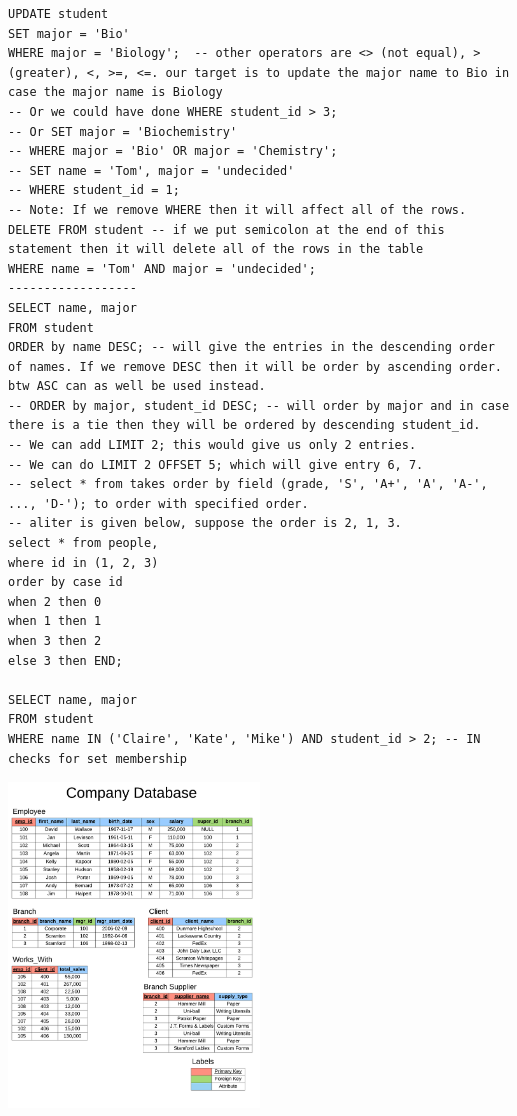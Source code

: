 \documentclass[8pt, a4paper, oneside, twocolumn]{extarticle}
\begin{document}
\begin{verbatim}
UPDATE student
SET major = 'Bio'
WHERE major = 'Biology';  -- other operators are <> (not equal), > (greater), <, >=, <=. our target is to update the major name to Bio in case the major name is Biology
-- Or we could have done WHERE student_id > 3;
-- Or SET major = 'Biochemistry'
-- WHERE major = 'Bio' OR major = 'Chemistry';
-- SET name = 'Tom', major = 'undecided'
-- WHERE student_id = 1;
-- Note: If we remove WHERE then it will affect all of the rows.
DELETE FROM student -- if we put semicolon at the end of this statement then it will delete all of the rows in the table
WHERE name = 'Tom' AND major = 'undecided';
------------------
SELECT name, major
FROM student
ORDER by name DESC; -- will give the entries in the descending order of names. If we remove DESC then it will be order by ascending order. btw ASC can as well be used instead.
-- ORDER by major, student_id DESC; -- will order by major and in case there is a tie then they will be ordered by descending student_id.
-- We can add LIMIT 2; this would give us only 2 entries.
-- We can do LIMIT 2 OFFSET 5; which will give entry 6, 7.
-- select * from takes order by field (grade, 'S', 'A+', 'A', 'A-', ..., 'D-'); to order with specified order.
-- aliter is given below, suppose the order is 2, 1, 3.
select * from people, 
where id in (1, 2, 3)
order by case id
when 2 then 0
when 1 then 1
when 3 then 2
else 3 then END;

SELECT name, major
FROM student
WHERE name IN ('Claire', 'Kate', 'Mike') AND student_id > 2; -- IN checks for set membership
\end{verbatim}
\includegraphics[width=0.5\textwidth,height=0.5\textheight,keepaspectratio]{company-database}
\end{document}
